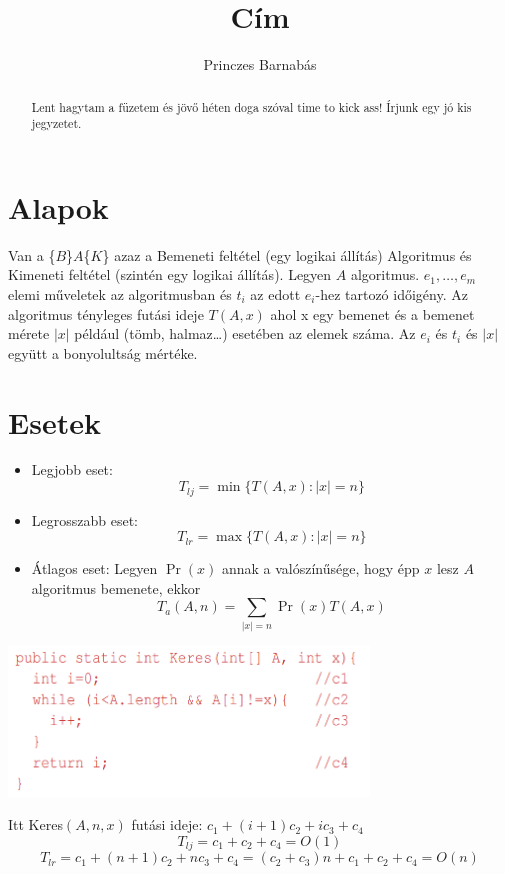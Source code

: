 \documentclass{article}
\title{Cím}
\author{Princzes
Barnabás}
\theoremstyle{mytheoremstyle}
\theoremstyle{mytheoremstyle}
\theoremstyle{myproblemstyle}
\begin{document}
\maketitle
\begin{abstract}
    Lent hagytam a füzetem és jövő héten doga szóval time to kick ass!
    Írjunk egy jó kis jegyzetet.
\end{abstract}
\section{Alapok}
Van a \{$B$\}$A$\{$K$\} azaz a Bemeneti
feltétel (egy logikai állítás) Algoritmus és Kimeneti feltétel
(szintén egy logikai állítás).
\newline
Legyen $A$ algoritmus. $e_1,\ldots,e_m$ elemi műveletek az algoritmusban
és $t_i$ az edott $e_i$-hez tartozó időigény. Az algoritmus tényleges futási ideje
$T(A,x)$ ahol x egy bemenet és a bemenet mérete $|x|$ például
(tömb, halmaz\ldots) esetében az elemek száma.
Az $e_i$ és $t_i$ és $|x|$ együtt a bonyolultság mértéke.

\newpage

\section{Esetek}
\begin{itemize}
    \item Legjobb eset: \[T_{lj} = \min \{T(A,x):|x|=n\}\]
    \item Legrosszabb eset: \[T_{lr} = \max\{T(A,x):|x|=n\}\]
    \item Átlagos eset: Legyen $\Pr(x)$ annak
          a valószínűsége, hogy épp $x$ lesz
          $A$ algoritmus bemenete, ekkor
          \newline \[T_a(A,n) = \sum_{|x|=n}\Pr(x)T(A,x)\]
\end{itemize}

\centering
\includegraphics[height=4cm]{keres}

Itt Keres$(A,n,x)$ futási ideje: $c_1+(i+1)c_2+ic_3+c_4$
\[T_{lj} = c_1+c_2+c_4 = O(1)\]
\[T_{lr} = c_1+(n+1)c_2+nc_3+c_4=(c_2+c_3)n+c_1+c_2+c_4=O(n)\]
\end{document}
